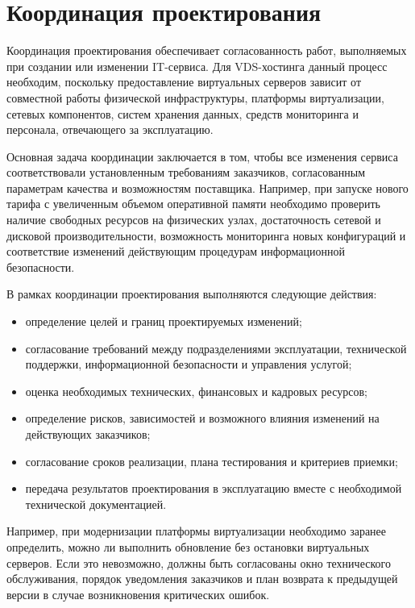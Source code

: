 \documentclass[14pt,a4paper]{extarticle}
\begin{document}
\section{Координация проектирования}

Координация проектирования обеспечивает согласованность работ, выполняемых при
создании или изменении IT-сервиса. Для VDS-хостинга данный процесс необходим,
поскольку предоставление виртуальных серверов зависит от совместной работы
физической инфраструктуры, платформы виртуализации, сетевых компонентов,
систем хранения данных, средств мониторинга и персонала, отвечающего за
эксплуатацию.

Основная задача координации заключается в том, чтобы все изменения сервиса
соответствовали установленным требованиям заказчиков, согласованным параметрам
качества и возможностям поставщика. Например, при запуске нового тарифа с
увеличенным объемом оперативной памяти необходимо проверить наличие свободных
ресурсов на физических узлах, достаточность сетевой и дисковой производительности,
возможность мониторинга новых конфигураций и соответствие изменений действующим
процедурам информационной безопасности.

В рамках координации проектирования выполняются следующие действия:
\begin{itemize}
    \item определение целей и границ проектируемых изменений;
    \item согласование требований между подразделениями эксплуатации,
    технической поддержки, информационной безопасности и управления услугой;
    \item оценка необходимых технических, финансовых и кадровых ресурсов;
    \item определение рисков, зависимостей и возможного влияния изменений на
    действующих заказчиков;
    \item согласование сроков реализации, плана тестирования и критериев приемки;
    \item передача результатов проектирования в эксплуатацию вместе с
    необходимой технической документацией.
\end{itemize}

Например, при модернизации платформы виртуализации необходимо заранее определить,
можно ли выполнить обновление без остановки виртуальных серверов. Если это
невозможно, должны быть согласованы окно технического обслуживания, порядок
уведомления заказчиков и план возврата к предыдущей версии в случае возникновения
критических ошибок.
\end{document}
